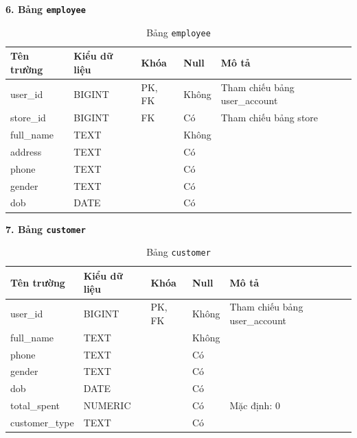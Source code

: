 \documentclass[12pt,a4paper]{report}
\begin{document}
\vspace{0.3cm}
\textbf{6. Bảng \texttt{employee}}
\vspace{0.1cm}
\begin{longtable}{|>{\ttfamily}p{3.5cm}|p{2.5cm}|p{1.5cm}|p{1.5cm}|p{5cm}|}
\caption{Bảng \texttt{employee}} \label{tab:db_employee} \\
\hline
\normalfont\textbf{Tên trường} & \textbf{Kiểu dữ liệu} & \textbf{Khóa} & \textbf{Null} & \textbf{Mô tả} \\ \hline
user\_id & BIGINT & PK, FK & Không & Tham chiếu bảng user\_account \\ \hline
store\_id & BIGINT & FK & Có & Tham chiếu bảng store \\ \hline
full\_name & TEXT & & Không & \\ \hline
address & TEXT & & Có & \\ \hline
phone & TEXT & & Có & \\ \hline
gender & TEXT & & Có & \\ \hline
dob & DATE & & Có & \\ \hline
\end{longtable}

\vspace{0.3cm}
\textbf{7. Bảng \texttt{customer}}
\vspace{0.1cm}
\begin{longtable}{|>{\ttfamily}p{3.5cm}|p{2.5cm}|p{1.5cm}|p{1.5cm}|p{5cm}|}
\caption{Bảng \texttt{customer}} \label{tab:db_customer} \\
\hline
\normalfont\textbf{Tên trường} & \textbf{Kiểu dữ liệu} & \textbf{Khóa} & \textbf{Null} & \textbf{Mô tả} \\ \hline
user\_id & BIGINT & PK, FK & Không & Tham chiếu bảng user\_account \\ \hline
full\_name & TEXT & & Không & \\ \hline
phone & TEXT & & Có & \\ \hline
gender & TEXT & & Có & \\ \hline
dob & DATE & & Có & \\ \hline
total\_spent & NUMERIC & & Có & Mặc định: 0 \\ \hline
customer\_type & TEXT & & Có & \\ \hline
\end{longtable}
\end{document}
